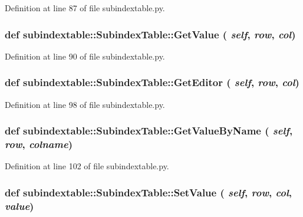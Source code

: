 Definition at line 87 of file subindextable.py.\hypertarget{classsubindextable_1_1SubindexTable_c365af6b3cd244b836e3f22fb839a93b}{
\subsubsection[GetValue]{\setlength{\rightskip}{0pt plus 5cm}def subindextable::Subindex\-Table::Get\-Value ( {\em self},  {\em row},  {\em col})}}
\label{classsubindextable_1_1SubindexTable_c365af6b3cd244b836e3f22fb839a93b}




Definition at line 90 of file subindextable.py.\hypertarget{classsubindextable_1_1SubindexTable_2e40735bad19bfc79a68770f23d1cce5}{
\subsubsection[GetEditor]{\setlength{\rightskip}{0pt plus 5cm}def subindextable::Subindex\-Table::Get\-Editor ( {\em self},  {\em row},  {\em col})}}
\label{classsubindextable_1_1SubindexTable_2e40735bad19bfc79a68770f23d1cce5}




Definition at line 98 of file subindextable.py.\hypertarget{classsubindextable_1_1SubindexTable_65a8c6f7466204e224a289af19248fda}{
\subsubsection[GetValueByName]{\setlength{\rightskip}{0pt plus 5cm}def subindextable::Subindex\-Table::Get\-Value\-By\-Name ( {\em self},  {\em row},  {\em colname})}}
\label{classsubindextable_1_1SubindexTable_65a8c6f7466204e224a289af19248fda}




Definition at line 102 of file subindextable.py.\hypertarget{classsubindextable_1_1SubindexTable_65aeea9932fde2c83878d00f4b78e275}{
\subsubsection[SetValue]{\setlength{\rightskip}{0pt plus 5cm}def subindextable::Subindex\-Table::Set\-Value ( {\em self},  {\em row},  {\em col},  {\em value})}}
\label{classsubindextable_1_1SubindexTable_65aeea9932fde2c83878d00f4b78e275}




